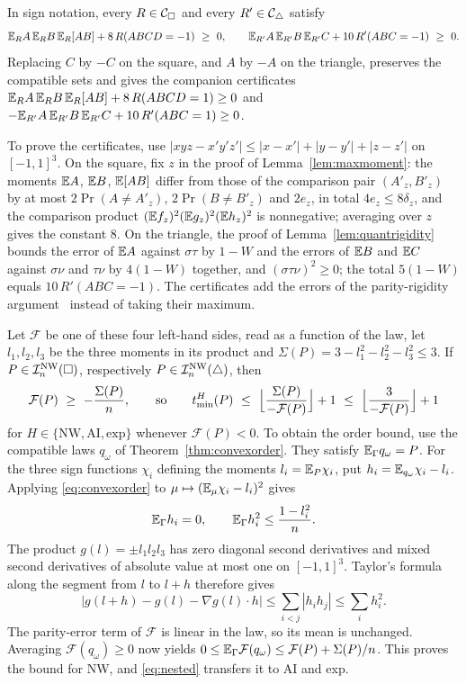 \begin{remark}\label{rem:cubicorder}
In sign notation, every $R\in\mathcal C_{\square}$ and every $R'\in\mathcal C_{\triangle}$ satisfy
\[
\E_RA\,\E_RB\,\E_R[AB]+8\,R(ABCD=-1)\ \ge\ 0,\qquad
\E_{R'}A\,\E_{R'}B\,\E_{R'}C+10\,R'(ABC=-1)\ \ge\ 0 .
\]
Replacing $C$ by $-C$ on the square, and $A$ by $-A$ on the triangle, preserves the compatible sets and gives the companion certificates $\mathbb E_RA\,\mathbb E_RB\,\mathbb E_R[AB]+8\,R(ABCD=1)\ge0$ and $-\mathbb E_{R'}A\,\mathbb E_{R'}B\,\mathbb E_{R'}C+10\,R'(ABC=1)\ge0$.

To prove the certificates, use $|xyz-x'y'z'|\le|x-x'|+|y-y'|+|z-z'|$ on $[-1,1]^3$. On the square, fix $z$ in the proof of Lemma~\ref{lem:maxmoment}: the moments $\mathbb E A$, $\mathbb E B$, $\mathbb E[AB]$ differ from those of the comparison pair $(A'_z,B'_z)$ by at most $2\Pr(A\ne A'_z)$, $2\Pr(B\ne B'_z)$ and $2e_z$, in total $4e_z\le8\delta_z$, and the comparison product $(\mathbb E f_z)^2(\mathbb E g_z)^2(\mathbb E h_z)^2$ is nonnegative; averaging over $z$ gives the constant $8$. On the triangle, the proof of Lemma~\ref{lem:quantrigidity} bounds the error of $\mathbb E A$ against $\sigma\tau$ by $1-W$ and the errors of $\mathbb E B$ and $\mathbb E C$ against $\sigma\nu$ and $\tau\nu$ by $4(1-W)$ together, and $(\sigma\tau\nu)^2\ge0$; the total $5(1-W)$ equals $10\,R'(ABC=-1)$. The certificates add the errors of the parity-rigidity argument~\cite{BoreiriEtAl2023,BoreiriEtAl2025} instead of taking their maximum.

Let $\mathcal F$ be one of these four left-hand sides, read as a function of the law, let $l_1,l_2,l_3$ be the three moments in its product and $\Sigma(P)=3-l_1^2-l_2^2-l_3^2\le3$. If $P\in\mathcal I^{\mathrm{NW}}_n(\square)$, respectively $P\in\mathcal I^{\mathrm{NW}}_n(\triangle)$, then
\[
\mathcal F(P)\ \ge\ -\frac{\Sigma(P)}n,\qquad\text{so}\qquad
\tmin^H(P)\ \le\ \Bigl\lfloor\frac{\Sigma(P)}{-\mathcal F(P)}\Bigr\rfloor+1\ \le\ \Bigl\lfloor\frac3{-\mathcal F(P)}\Bigr\rfloor+1
\]
for $H\in\{\mathrm{NW},\mathrm{AI},\mathrm{exp}\}$ whenever $\mathcal F(P)<0$.
To obtain the order bound, use the compatible laws $q_\omega$ of Theorem~\ref{thm:convexorder}. They satisfy $\mathbb E_\Gamma q_\omega=P$. For the three sign functions $\chi_i$ defining the moments $l_i=\mathbb E_P\chi_i$, put $h_i=\mathbb E_{q_\omega}\chi_i-l_i$. Applying \eqref{eq:convexorder} to $\mu\mapsto(\mathbb E_\mu\chi_i-l_i)^2$ gives
\[
\mathbb E_\Gamma h_i=0,\qquad \mathbb E_\Gamma h_i^2\le\frac{1-l_i^2}{n}.
\]
The product $g(l)=\pm l_1l_2l_3$ has zero diagonal second derivatives and mixed second derivatives of absolute value at most one on $[-1,1]^3$. Taylor's formula along the segment from $l$ to $l+h$ therefore gives
\[
\bigl|g(l+h)-g(l)-\nabla g(l)\cdot h\bigr|
\le\sum_{i<j}|h_ih_j|\le\sum_i h_i^2.
\]
The parity-error term of $\mathcal F$ is linear in the law, so its mean is unchanged. Averaging $\mathcal F(q_\omega)\ge0$ now yields $0\le\mathbb E_\Gamma\mathcal F(q_\omega)\le\mathcal F(P)+\Sigma(P)/n$. This proves the bound for NW, and \eqref{eq:nested} transfers it to AI and exp.


\end{remark}
